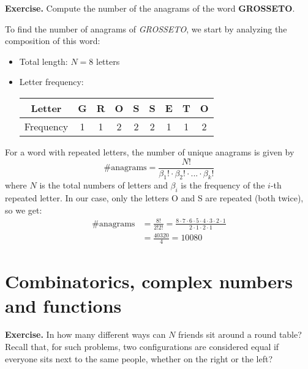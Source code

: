 \documentclass[a4paper,10 pt]{report}
\theoremstyle{definition}
\begin{document}
\begin{exerciseBox}\textbf{Exercise.} Compute the number of the anagrams of the word \textbf{GROSSETO}. \end{exerciseBox}

\begin{solutionBox}
To find the number of anagrams of \textit{GROSSETO}, we start by analyzing the composition of this word:
\begin{itemize}
    \item Total length: $N = 8$ letters
    \item Letter frequency:
        \begin{center}
        \begin{tabular}{|c|c|c|c|c|c|c|c|c|}
        \hline
        Letter & G & R & O & S & S & E & T & O \\
        \hline
        Frequency & 1 & 1 & 2 & 2 & 2 & 1 & 1 & 2 \\
        \hline
        \end{tabular}
        \end{center}
\end{itemize}
For a word with repeated letters, the number of unique anagrams is given by
\[
    \# \text{anagrams} = \frac{N!}{\beta_1! \cdot \beta_2! \cdot ... \cdot \beta_k!}
\]
where $N$ is the total numbers of letters and $\beta_i$ is the frequency of the $i$-th repeated letter. In our case, only the letters O and S are repeated (both twice), so we get:
\begin{align*}
    \# \text{anagrams} &= \frac{8!}{2!2!} = \frac{8 \cdot 7 \cdot 6 \cdot 5 \cdot 4 \cdot 3 \cdot 2 \cdot 1}{2 \cdot 1 \cdot 2 \cdot 1} \\[1em]
    &= \frac{40{}320}{4} = 10{}080
\end{align*}

\begin{finalAnswer}
\end{finalAnswer}
\end{solutionBox}




\chapter{Combinatorics, complex numbers and functions}

\begin{exerciseBox}
\textbf{Exercise.} In how many different ways can $N$ friends sit around a round table? Recall that, for such problems, two configurations are considered equal if everyone sits next to the same people, whether on the right or the left?
\end{exerciseBox}
\end{document}

